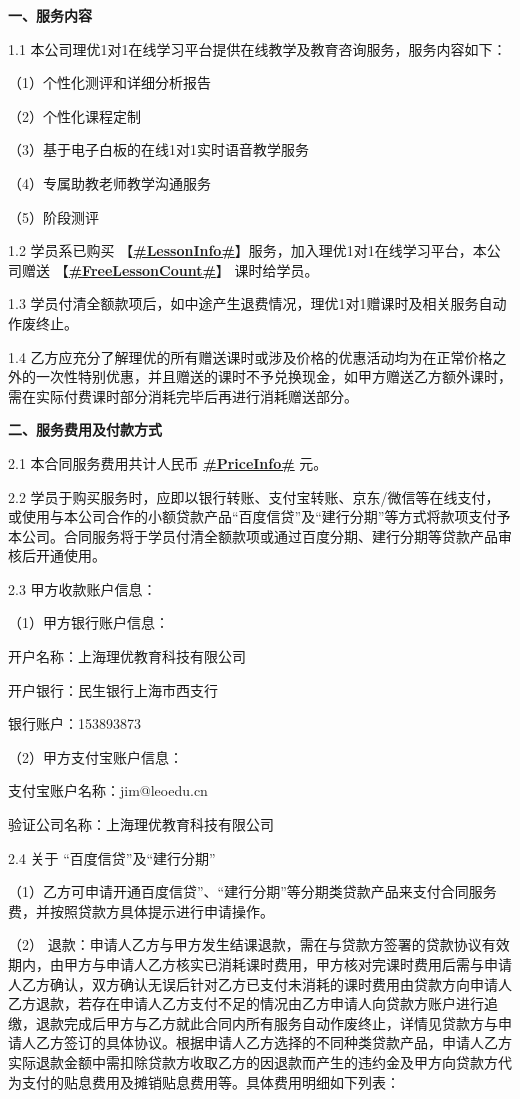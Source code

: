 \documentclass {ctexart}
\begin{document}
\textbf{一、服务内容 }

1.1	本公司理优1对1在线学习平台提供在线教学及教育咨询服务，服务内容如下：

（1）个性化测评和详细分析报告	

（2）个性化课程定制

（3）基于电子白板的在线1对1实时语音教学服务	

（4）专属助教老师教学沟通服务

（5）阶段测评

1.2	学员系已购买 【\underline{\textbf{#LessonInfo#}}】服务，加入理优1对1在线学习平台，本公司赠送    【\underline{\textbf{#FreeLessonCount#}}】  课时给学员。

1.3	学员付清全额款项后，如中途产生退费情况，理优1对1赠课时及相关服务自动作废终止。

1.4	乙方应充分了解理优的所有赠送课时或涉及价格的优惠活动均为在正常价格之外的一次性特别优惠，并且赠送的课时不予兑换现金，如甲方赠送乙方额外课时，需在实际付费课时部分消耗完毕后再进行消耗赠送部分。


\newpage
\textbf{二、服务费用及付款方式}

2.1	本合同服务费用共计人民币 \textbf{\underline{#PriceInfo#}} 元。

2.2	学员于购买服务时，应即以银行转账、支付宝转账、京东/微信等在线支付，或使用与本公司合作的小额贷款产品“百度信贷”及“建行分期”等方式将款项支付予本公司。合同服务将于学员付清全额款项或通过百度分期、建行分期等贷款产品审核后开通使用。

2.3	甲方收款账户信息：

（1）甲方银行账户信息：

开户名称：上海理优教育科技有限公司

开户银行：民生银行上海市西支行

银行账户：153893873

（2）甲方支付宝账户信息：

支付宝账户名称：jim@leoedu.cn

验证公司名称：上海理优教育科技有限公司

2.4	关于 “百度信贷”及“建行分期”

（1）乙方可申请开通百度信贷”、“建行分期”等分期类贷款产品来支付合同服务费，并按照贷款方具体提示进行申请操作。

（2） 退款：申请人乙方与甲方发生结课退款，需在与贷款方签署的贷款协议有效期内，由甲方与申请人乙方核实已消耗课时费用，甲方核对完课时费用后需与申请人乙方确认，双方确认无误后针对乙方已支付未消耗的课时费用由贷款方向申请人乙方退款，若存在申请人乙方支付不足的情况由乙方申请人向贷款方账户进行追缴，退款完成后甲方与乙方就此合同内所有服务自动作废终止，详情见贷款方与申请人乙方签订的具体协议。根据申请人乙方选择的不同种类贷款产品，申请人乙方实际退款金额中需扣除贷款方收取乙方的因退款而产生的违约金及甲方向贷款方代为支付的贴息费用及摊销贴息费用等。具体费用明细如下列表：
\end{document}
